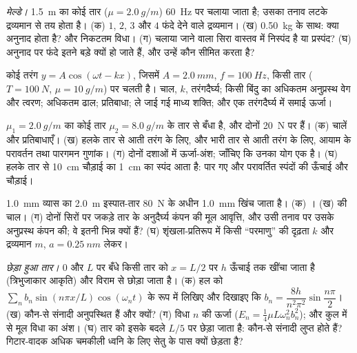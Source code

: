 \begin{exercise}[$\star\star$]\label{exo:b2:waves-on-strings:6}
\emph{मेल्डे।} \qty{1.5}{m} का कोई तार ($\mu = \qty{2.0}{g/m}$)
\qty{60}{Hz} पर चलाया जाता है; उसका तनाव लटके द्रव्यमान से तय होता है। (क) $1$, $2$, $3$ और $4$ फंदे
देने वाले द्रव्यमान। (ख) \qty{0.50}{kg} के साथ: क्या अनुनाद होता है?
और निकटतम विधा। (ग) चलाया जाने वाला सिरा वास्तव में निस्पंद है या प्रस्पंद?
(घ) अनुनाद पर फंदे इतने बड़े क्यों हो जाते हैं, और उन्हें कौन सीमित करता है?
\end{exercise}

\begin{exercise}[$\star\star$]\label{exo:b2:waves-on-strings:7}
कोई तरंग $y = A\cos(\omega t - kx)$, जिसमें $A = \qty{2.0}{mm}$, $f = \qty{100}{Hz}$,
किसी तार ($T = \qty{100}{N}$, $\mu = \qty{10}{g/m}$) पर चलती है। चाल, $k$,
तरंगदैर्घ्य; किसी बिंदु का अधिकतम अनुप्रस्थ वेग और त्वरण;
अधिकतम ढाल; प्रतिबाधा; ले जाई गई माध्य शक्ति; और एक
तरंगदैर्घ्य में समाई ऊर्जा।
\end{exercise}

\begin{exercise}[$\star\star$]\label{exo:b2:waves-on-strings:8}
$\mu_1 = \qty{2.0}{g/m}$ का कोई तार $\mu_2 = \qty{8.0}{g/m}$ के तार से बँधा है,
और दोनों \qty{20}{N} पर हैं। (क) चालें और प्रतिबाधाएँ। (ख) हलके तार से
आती तरंग के लिए, और भारी तार से आती तरंग के लिए, आयाम के
परावर्तन तथा पारगमन गुणांक। (ग) दोनों दशाओं में ऊर्जा-अंश;
जाँचिए कि उनका योग एक है। (घ) हलके तार से \qty{10}{cm} चौड़ाई का \qty{1}{cm} का स्पंद
आता है: पार गए और परावर्तित स्पंदों की ऊँचाई और
चौड़ाई।
\end{exercise}

\begin{exercise}[$\star\star$]\label{exo:b2:waves-on-strings:9}
\qty{1.0}{mm} व्यास का \qty{2.0}{m} इस्पात-तार \qty{80}{N} के अधीन
\qty{1.0}{mm} खिंच जाता है। (क) । (ख)  की चाल।
(ग) दोनों सिरों पर जकड़े तार के अनुदैर्घ्य कंपन की मूल आवृत्ति,
और उसी तनाव पर उसके अनुप्रस्थ कंपन की; वे इतनी भिन्न क्यों हैं? (घ)
शृंखला-प्रतिरूप में किसी ``परमाणु'' की दृढ़ता $k$ और द्रव्यमान $m$, $a = \qty{0.25}{nm}$ लेकर।
\end{exercise}

\begin{exercise}[$\star\star\star$]\label{exo:b2:waves-on-strings:10}
\emph{छेड़ा हुआ तार।} $0$ और $L$ पर बँधे किसी तार को
$x = L/2$ पर $h$ ऊँचाई तक खींचा जाता है (त्रिभुजाकार आकृति) और विराम से छोड़ा जाता है।
(क) हल को $\sum_nb_n\sin(n\pi x/L)\cos(\omega_nt)$ के रूप में लिखिए और दिखाइए
कि $b_n = \dfrac{8h}{n^2\pi^2}\sin\dfrac{n\pi}2$। (ख) कौन-से संनादी
अनुपस्थित हैं और क्यों? (ग) विधा $n$ की ऊर्जा ($E_n = \tfrac14\mu L\omega_n^2b_n^2$);
और कुल में से मूल विधा का अंश। (घ) तार को इसके बदले
$L/5$ पर छेड़ा जाता है: कौन-से संनादी लुप्त होते हैं? गिटार-वादक अधिक चमकीली
ध्वनि के लिए सेतु के पास क्यों छेड़ता है?
\end{exercise}

